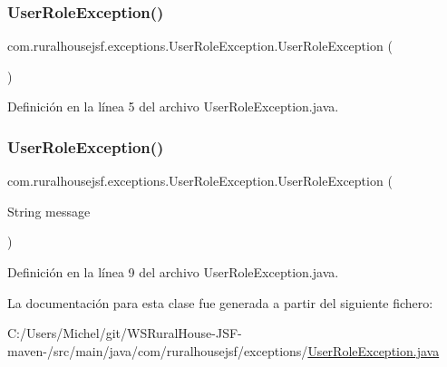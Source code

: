 \subsubsection{\texorpdfstring{UserRoleException()}{UserRoleException()}\hspace{0.1cm}{\footnotesize\ttfamily [1/2]}}
{\footnotesize\ttfamily com.\+ruralhousejsf.\+exceptions.\+User\+Role\+Exception.\+User\+Role\+Exception (\begin{DoxyParamCaption}{ }\end{DoxyParamCaption})}



Definición en la línea 5 del archivo User\+Role\+Exception.\+java.

\mbox{\label{classcom_1_1ruralhousejsf_1_1exceptions_1_1_user_role_exception_a7c888f23edf10f7c1347519b6d03752d}} 
\subsubsection{\texorpdfstring{UserRoleException()}{UserRoleException()}\hspace{0.1cm}{\footnotesize\ttfamily [2/2]}}
{\footnotesize\ttfamily com.\+ruralhousejsf.\+exceptions.\+User\+Role\+Exception.\+User\+Role\+Exception (\begin{DoxyParamCaption}\item[{String}]{message }\end{DoxyParamCaption})}



Definición en la línea 9 del archivo User\+Role\+Exception.\+java.



La documentación para esta clase fue generada a partir del siguiente fichero\+:\begin{DoxyCompactItemize}
\item 
C\+:/\+Users/\+Michel/git/\+W\+S\+Rural\+House-\/\+J\+S\+F-\/maven-\//src/main/java/com/ruralhousejsf/exceptions/\mbox{\hyperlink{_user_role_exception_8java}{User\+Role\+Exception.\+java}}\end{DoxyCompactItemize}
